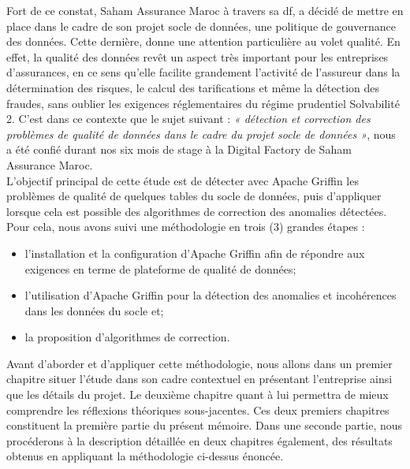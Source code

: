 Fort de ce constat, Saham Assurance Maroc \`a travers sa \acrlong{df}, a d\'ecid\'e de mettre en place dans le cadre de son projet socle de donn\'ees, une politique de gouvernance des donn\'ees. Cette derni\`ere, donne une attention particuli\`ere au volet qualit\'e. En effet, la qualit\'e des donn\'ees revêt un aspect très important pour les entreprises d'assurances, en ce sens qu'elle facilite grandement l'activit\'e de l'assureur dans la d\'etermination des risques, le calcul des tarifications et même la d\'etection des fraudes, sans oublier les exigences réglementaires du r\'egime prudentiel Solvabilit\'e 2. C’est dans ce contexte que le sujet suivant : \textit{« détection et correction des problèmes de qualité de données dans le cadre du projet socle de données »}, nous a été confié durant nos six mois de stage \`a la Digital Factory de Saham Assurance Maroc.\\

L'objectif principal de cette \'etude est de d\'etecter avec Apache Griffin les probl\`emes de qualit\'e de quelques tables du socle de donn\'ees, puis d'appliquer lorsque cela est possible des algorithmes de correction des anomalies d\'etect\'ees. Pour cela, nous avons suivi une m\'ethodologie en trois (3) grandes \'etapes : 
\begin{itemize}[parsep=0cm,itemsep=0cm]
    \item l'installation et la configuration d'Apache Griffin afin de r\'epondre aux exigences en terme de plateforme de qualit\'e de donn\'ees;
    \item l'utilisation d'Apache Griffin pour la d\'etection des anomalies et incoh\'erences dans les donn\'ees du socle et;
    \item la proposition d'algorithmes de correction.
\end{itemize}
Avant d'aborder et d'appliquer cette m\'ethodologie, nous allons dans un premier chapitre situer l'\'etude dans son cadre contextuel en pr\'esentant l'entreprise ainsi que les d\'etails du projet. Le deuxi\`eme chapitre  quant \`a lui permettra de mieux comprendre les réflexions théoriques sous-jacentes. Ces deux premiers chapitres constituent la premi\`ere partie du pr\'esent m\'emoire. Dans une seconde partie, nous procéderons à la description détaillée en deux chapitres \'egalement, des r\'esultats obtenus en appliquant la m\'ethodologie ci-dessus \'enonc\'ee. 


